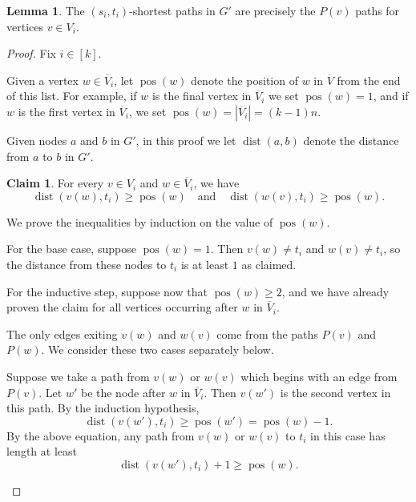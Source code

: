 \documentclass[11pt]{article}
\DeclareMathOperator{\dist}{dist}
\renewcommand{\bar}{\overline}
\DeclareMathOperator{\pos}{pos}
\theoremstyle{definition}
\newtheorem{lemma}[theorem]{Lemma}
\newtheorem{claim}[theorem]{Claim}
\begin{document}
\begin{lemma}
\label{canonical-sp}
    The $(s_i,t_i)$-shortest paths in $G'$ are precisely the $P(v)$ paths for vertices $v\in V_i$.
\end{lemma}
\begin{proof}
Fix $i\in[k]$.

Given a vertex $w\in \bar{V}_i$, let $\pos(w)$ denote the position of $w$ in $\overline{V}$ from the end of this list.
For example, if $w$ is the final vertex in $\overline{V}_i$ we set $\pos(w) = 1$, and if $w$ is the first vertex in $\bar{V}_i$, we set $\pos(w) = |\bar{V}_i| = (k-1)n$.

Given nodes $a$ and $b$ in $G'$, in this proof we let $\dist(a,b)$ denote the distance from $a$ to $b$ in $G'$.

\begin{claim}
\label{claim:distance}
    For every $v\in V_i$ and $w\in \bar{V}_i$,
    we have 
    \begin{equation}
    \label{induction}
    \dist(v(w),t_i) \ge \pos(w)\quad\text{and}\quad \dist(w(v),t_i)\ge \pos(w).
    \end{equation}
\end{claim}
\begin{claimproof}
    We prove the inequalities by induction on the value of $\pos(w)$.

    For the base case, suppose $\pos(w) = 1$.
    Then $v(w)\neq t_i$ and $w(v)\neq t_i$, so the distance from these nodes to $t_i$ is at least $1$ as claimed.

    For the inductive step, suppose now that $\pos(w) \ge 2$, and we have already proven the claim for all vertices occurring after $w$ in $\bar{V}_i$.
    
    
    The only edges exiting $v(w)$ and $w(v)$ come from the paths $P(v)$ and $P(w)$.
    We consider these two cases separately below.

Suppose we take a path from $v(w)$ or $w(v)$ which begins with an edge from $P(v)$.
Let $w'$ be the node after $w$ in $\bar{V}_i$.
Then $v(w')$ is the second vertex in this path.
By the induction hypothesis, 
\[\dist(v(w'),t_i) \ge \pos(w') = \pos(w)-1.\]
By the above equation, any path from $v(w)$ or $w(v)$ to $t_i$ in this case has length at least 
    \[\dist(v(w'),t_i) + 1  \ge \pos(w).\]


\end{claimproof}
\end{proof}
\end{document}
